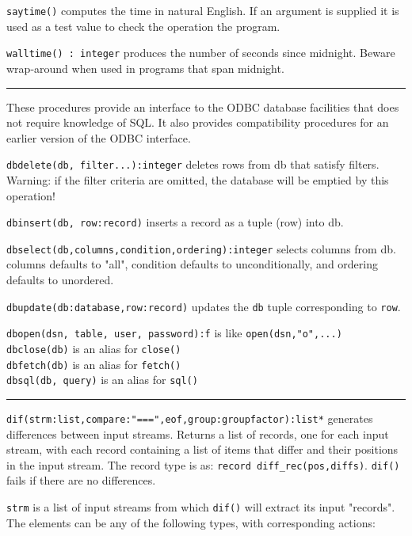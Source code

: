 \texttt{saytime()} computes the time in natural English. If an argument
is supplied it is used as a test value to check the operation the
program.

\texttt{walltime() : integer} produces the number of seconds since
midnight. Beware wrap-around when used in programs that span midnight.

\vspace{0.25cm}\hrule{}

These procedures provide an interface to the ODBC database facilities
that does not require knowledge of SQL. It also provides compatibility
procedures for an earlier version of the ODBC interface.

\texttt{dbdelete(db, filter...):integer} deletes rows from db that satisfy
filters. Warning: if the filter criteria are omitted, the
database will be emptied by this operation!

\texttt{dbinsert(db, row:record)} inserts a record as a tuple (row) into db.

\texttt{dbselect(db,columns,condition,ordering):integer} selects columns from db.
columns defaults to "all", condition
defaults to unconditionally, and ordering defaults to unordered.

\texttt{dbupdate(db:database,row:record)} updates the \texttt{db} tuple
corresponding to \texttt{row}.

\texttt{dbopen(dsn, table, user, password):f} is like
\texttt{open(dsn,"o",...)}\\
\texttt{dbclose(db)} is an alias for \texttt{close()}\\
\texttt{dbfetch(db)} is an alias for \texttt{fetch()}\\
\texttt{dbsql(db, query)} is an alias for \texttt{sql()}

\vspace{0.25cm}\hrule{}

\texttt{dif(strm:list,compare:"===",eof,group:groupfactor):list*}
generates differences between input streams. 
Returns a list of records, one for each input stream, with each
record containing a list of items that differ and their positions in
the input stream. The record type is as: \texttt{record
diff\_rec(pos,diffs)}. \texttt{dif()} fails if there are no
differences.

\texttt{strm} is a list of input streams from which \texttt{dif()} will
extract its input "records". The elements
can be any of the following types, with corresponding actions:

